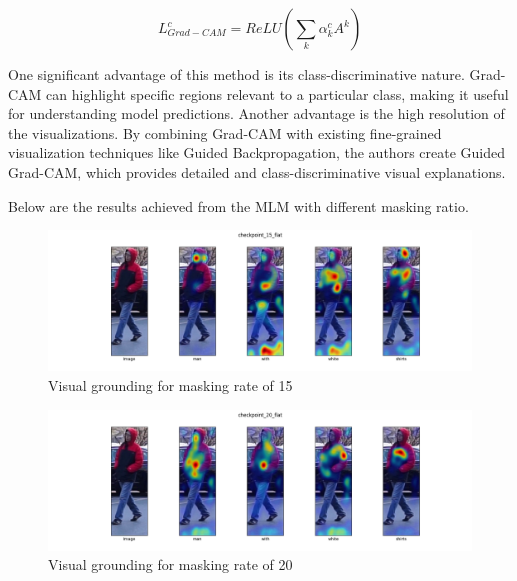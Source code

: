 \begin{displaymath}
    L^c_{Grad-CAM} = ReLU(\sum_k\alpha^c_kA^k)
\end{displaymath}

One significant advantage of this method is its class-discriminative nature. Grad-CAM can highlight specific regions relevant to a particular class, making it useful for understanding model predictions. Another advantage is the high resolution of the visualizations. By combining Grad-CAM with existing fine-grained visualization techniques like Guided Backpropagation, the authors create Guided Grad-CAM, which provides detailed and class-discriminative visual explanations.


Below are the results achieved from the MLM with different masking ratio.

\begin{figure}[htbp]
  \includegraphics[width=\linewidth]{img/mlm2/mlm-checkpoint_15_flat.png}
  \caption{Visual grounding for masking rate of 15}
  \label{fig:mlm_1}
\end{figure}

\begin{figure}[htbp]
  \includegraphics[width=\linewidth]{img/mlm2/mlm-checkpoint_20_flat.png}
  \caption{Visual grounding for masking rate of 20}
  \label{fig:mlm_2}
\end{figure}


